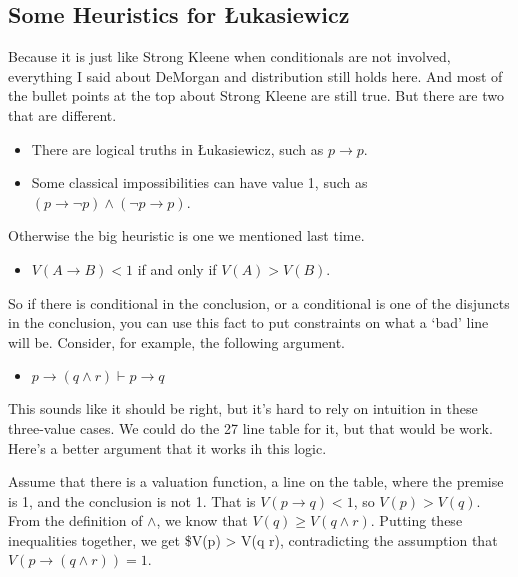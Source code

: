 \documentclass[
]{article}
\providecommand{\tightlist}{%
  \setlength{\itemsep}{0pt}\setlength{\parskip}{0pt}}\usepackage{longtable,booktabs,array}
\begin{document}
\hypertarget{some-heuristics-for-ux142ukasiewicz}{%
\subsection{Some Heuristics for
Łukasiewicz}\label{some-heuristics-for-ux142ukasiewicz}}

Because it is just like Strong Kleene when conditionals are not
involved, everything I said about DeMorgan and distribution still holds
here. And most of the bullet points at the top about Strong Kleene are
still true. But there are two that are different.

\begin{itemize}
\tightlist
\item
  There are logical truths in Łukasiewicz, such as \(p \rightarrow p\).
\item
  Some classical impossibilities can have value 1, such as
  \((p \rightarrow \neg p) \wedge (\neg p \rightarrow p)\).
\end{itemize}

Otherwise the big heuristic is one we mentioned last time.

\begin{itemize}
\tightlist
\item
  \(V(A \rightarrow B) < 1\) if and only if \(V(A) > V(B)\).
\end{itemize}

So if there is conditional in the conclusion, or a conditional is one of
the disjuncts in the conclusion, you can use this fact to put
constraints on what a `bad' line will be. Consider, for example, the
following argument.

\begin{itemize}
\tightlist
\item
  \(p \rightarrow (q \wedge r) \vdash p \rightarrow q\)
\end{itemize}

This sounds like it should be right, but it's hard to rely on intuition
in these three-value cases. We could do the 27 line table for it, but
that would be work. Here's a better argument that it works ih this
logic.

Assume that there is a valuation function, a line on the table, where
the premise is 1, and the conclusion is not 1. That is
\(V(p \rightarrow q) < 1\), so \(V(p) > V(q)\). From the definition of
\(\wedge\), we know that \(V(q) \geq V(q \wedge r)\). Putting these
inequalities together, we get \$V(p) \textgreater{} V(q \wedge r),
contradicting the assumption that \(V(p \rightarrow (q \wedge r)) = 1\).
\end{document}
